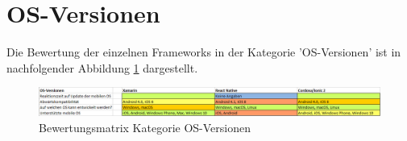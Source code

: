 \section{OS-Versionen}

Die Bewertung der einzelnen Frameworks in der Kategorie 'OS-Versionen' ist in nachfolgender Abbildung \ref{fig:AuswOSVersionen} dargestellt.
\clearpage

\begin{figure}[h]
	\centering
	\includegraphics[width=1\textwidth]{Bilder/Auswertung_OSVersionen.PNG}
	\caption{Bewertungsmatrix Kategorie OS-Versionen}
	\label{fig:AuswOSVersionen}
\end{figure}

